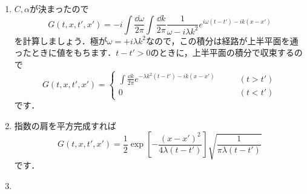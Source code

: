 \documentclass[a4paper,pdflatex,ja=standard]{bxjsarticle}
\begin{document}
\begin{enumerate}
  \item 

  $C,\alpha$が決まったので
  \begin{equation}
    G(t,x,t',x')
    =
    -i
    \int\frac{\dd \omega}{2\pi}\int\frac{\dd k}{2\pi}
    \frac{1}{\omega-i\lambda k^2}
    e^{i\omega(t-t')-ik(x-x')}
  \end{equation}
  を計算しましょう．極が$\omega=+i\lambda k^2$なので，この積分は経路が上半平面を通ったときに値をもちます．$t-t'>0$のときに，上半平面の積分で収束するので
  \begin{equation}
    G(t,x,t',x')
    =
    \left\{
      \begin{alignedat}{1}
        \int\frac{\dd k}{2\pi}e^{-\lambda k^2(t-t')-ik(x-x')}
        &
        \qquad
        (t>t')
        \\
        0
        &
        \qquad
        (t<t')
      \end{alignedat}
    \right.    
  \end{equation}
  です．


  \item 

  指数の肩を平方完成すれば
  \begin{equation}
    G(t,x,t',x')
    =
    \frac{1}{2}
    \exp\left[  
      -\frac{(x-x')^2}{4\lambda(t-t')}
    \right]
    \sqrt{\frac{1}{\pi\lambda(t-t')}}
  \end{equation}
  です．


  \item 


\end{enumerate}
\end{document}
